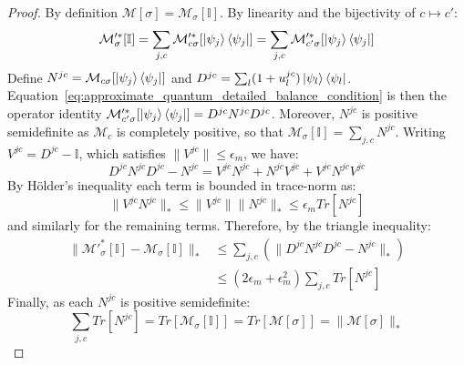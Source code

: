 \documentclass[aps,floatfix,10pt,amssymb,amsfont,amsmath,superscriptaddress,float,nofootinbib,longbibliography,nobalancelastpage,twocolumn]{revtex4-2}
\begin{document}
\begin{proof}
    By definition $\mathcal{M}[\sigma]=\mathcal{M}_{\sigma}[\mathbb{I}]$. By linearity and the bijectivity of $c \mapsto c'$:
    \begin{equation}
        \mathcal{M}'^*_{\sigma}[\mathbb{I}] = \sum_{j,c}\mathcal{M}'^*_{c\sigma}[\ket{\psi_j}\bra{\psi_j}] = \sum_{j,c}\mathcal{M}'^*_{c'\sigma}[\ket{\psi_j}\bra{\psi_j}]
    \end{equation}
    Define $N^{jc} = \mathcal{M}_{c\sigma}[\ket{\psi_j}\bra{\psi_j}]$ and $D^{jc}=\sum_l(1+u_l^{jc})\ket{\psi_l}\bra{\psi_l}$. Equation~\eqref{eq:approximate_quantum_detailed_balance_condition} is then the operator identity $\mathcal{M}'^*_{c'\sigma}[\ket{\psi_j}\bra{\psi_j}]=D^{jc}N^{jc}D^{jc}$. Moreover, $N^{jc}$ is positive semidefinite as $\mathcal{M}_c$ is completely positive, so that $\mathcal{M}_{\sigma}[\mathbb{I}] = \sum_{j,c}N^{jc}$. Writing $V^{jc} = D^{jc}-\mathbb{I}$, which satisfies $\|V^{jc}\|\leq\epsilon_m$, we have:
    \begin{equation}
        D^{jc}N^{jc}D^{jc} - N^{jc} = V^{jc}N^{jc} + N^{jc}V^{jc} + V^{jc}N^{jc}V^{jc}
    \end{equation}
    By H\"older's inequality each term is bounded in trace-norm as:
    \begin{equation}
        \|V^{jc}N^{jc}\|_* \leq \|V^{jc}\|\|N^{jc}\|_* \leq \epsilon_m Tr[N^{jc}]
    \end{equation}
    and similarly for the remaining terms. Therefore, by the triangle inequality:
    \begin{align}
        \|\mathcal{M}'^*_{\sigma}[\mathbb{I}]-\mathcal{M}_\sigma[\mathbb{I}]\|_* &\leq \sum_{j,c}\left(\|D^{jc}N^{jc}D^{jc}-N^{jc}\|_*\right)\\
        &\leq (2\epsilon_m+\epsilon_m^2)\sum_{j,c}Tr[N^{jc}] 
    \end{align}
    Finally, as each $N^{jc}$ is positive semidefinite:
    \begin{equation}
        \sum_{j,c}Tr[N^{jc}] = Tr[\mathcal{M}_{\sigma}[\mathbb{I}]] = Tr[\mathcal{M}[\sigma]] = \|\mathcal{M}[\sigma]\|_*
    \end{equation}
\end{proof}
\end{document}
